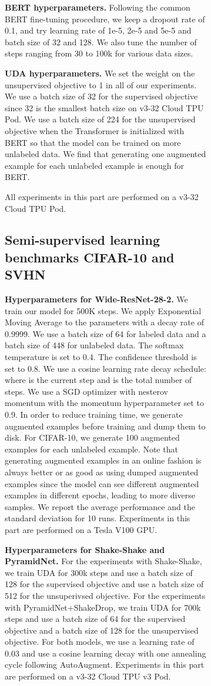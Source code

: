 \documentclass{article}
\newcommand\bertft{BERT\xspace}
\begin{document}
\begin{figure}[ht]
\begin{subfigure}{.19\textwidth}
{\textbf{BERT hyperparameters.} Following the common BERT fine-tuning procedure, we keep a dropout rate of 0.1, and try learning rate of 1e-5, 2e-5 and 5e-5 and batch size of 32 and 128. We also tune the number of steps ranging from 30 to 100k for various data sizes.

\textbf{UDA hyperparameters.} We set the weight on the unsupervised objective  to 1 in all of our experiments. We use a batch size of 32 for the supervised objective since 32 is the smallest batch size on v3-32 Cloud TPU Pod. We use a batch size of 224 for the unsupervised objective when the Transformer is initialized with BERT so that the model can be trained on more unlabeled data. We find that generating one augmented example for each unlabeled example is enough for \bertft. 


All experiments in this part are performed on a v3-32 Cloud TPU Pod. 


\subsection{Semi-supervised learning benchmarks CIFAR-10 and SVHN}   
\textbf{Hyperparameters for Wide-ResNet-28-2.} 
We train our model for 500K steps. We apply Exponential Moving Average to the parameters with a decay rate of 0.9999. We use a batch size of 64 for labeled data and a batch size of 448 for unlabeled data. The softmax temperature  is set to 0.4. The confidence threshold  is set to 0.8. We use a cosine learning rate decay schedule:  where  is the current step and  is the total number of steps. We use a SGD optimizer with nesterov momentum with the momentum hyperparameter set to 0.9. 
In order to reduce training time, we generate augmented examples before training and dump them to disk. For CIFAR-10, we generate 100 augmented examples for each unlabeled example. Note that generating augmented examples in an online fashion is always better or as good as using dumped augmented examples since the model can see different augmented examples in different epochs, leading to more diverse samples. We report the average performance and the standard deviation for 10 runs.
Experiments in this part are performed on a Tesla V100 GPU. 


\textbf{Hyperparameters for Shake-Shake and PyramidNet.} For the experiments with Shake-Shake, we train UDA for 300k steps and use a batch size of 128 for the supervised objective and use a batch size of 512 for the unsuperivsed objective. For the experiments with PyramidNet+ShakeDrop, we train UDA for 700k steps and use a batch size of 64 for the supervised objective and a batch size of 128 for the unsupervised objective. For both models, we use a learning rate of 0.03 and use a cosine learning decay with one annealing cycle following AutoAugment. Experiments in this part are performed on a v3-32 Cloud TPU v3 Pod. 

}
\end{subfigure}
\end{figure}
\end{document}
